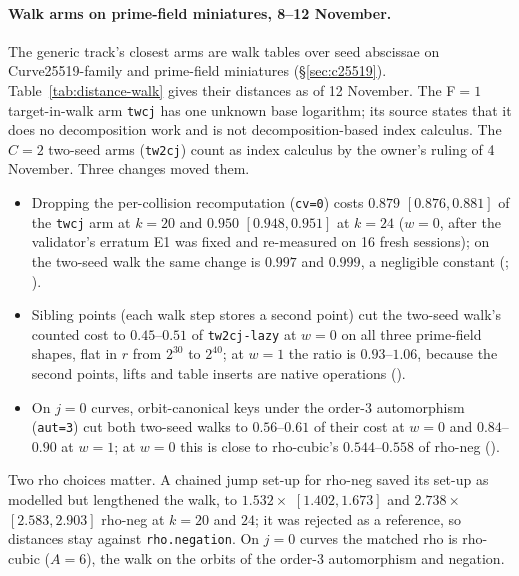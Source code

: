 \paragraph{Walk arms on prime-field miniatures, 8--12 November.} The
generic track's closest arms are walk tables over seed abscissae on
Curve25519-family and prime-field miniatures (\S\ref{sec:c25519}).
Table~\ref{tab:distance-walk} gives their distances as of 12 November.
The F$=1$ target-in-walk arm \texttt{twcj} has one unknown base logarithm;
its source states that it does no decomposition work and is not
decomposition-based index calculus. The $C=2$ two-seed arms
(\texttt{tw2cj}) count as index calculus by the owner's ruling of 4
November. Three changes moved them.
\begin{itemize}
\item Dropping the per-collision recomputation (\texttt{cv=0}) costs
  $0.879$ $[0.876,0.881]$ of the \texttt{twcj} arm at $k=20$ and $0.950$
  $[0.948,0.951]$ at $k=24$ ($w=0$, after the validator's erratum E1 was
  fixed and re-measured on 16 fresh sessions); on the two-seed walk the
  same change is $0.997$ and $0.999$, a negligible constant
  (;
  ).
\item Sibling points (each walk step stores a second point) cut the
  two-seed walk's counted cost to $0.45$--$0.51$ of \texttt{tw2cj-lazy} at
  $w=0$ on all three prime-field shapes, flat in $r$ from $2^{30}$ to
  $2^{40}$; at $w=1$ the ratio is $0.93$--$1.06$, because the second points,
  lifts and table inserts are native operations
  ().
\item On $j=0$ curves, orbit-canonical keys under the order-3 automorphism
  (\texttt{aut=3}) cut both two-seed walks to $0.56$--$0.61$ of their cost
  at $w=0$ and $0.84$--$0.90$ at $w=1$; at $w=0$ this is close to
  rho-cubic's $0.544$--$0.558$ of rho-neg
  ().
\end{itemize}
Two rho choices matter. A chained jump set-up for rho-neg saved its set-up
as modelled but lengthened the walk, to $1.532\times$ $[1.402,1.673]$ and
$2.738\times$ $[2.583,2.903]$ rho-neg at $k=20$ and $24$; it was rejected
as a reference, so distances stay against \texttt{rho.negation}. On $j=0$
curves the matched rho is rho-cubic ($A=6$), the walk on the orbits of
the order-3 automorphism and negation.

